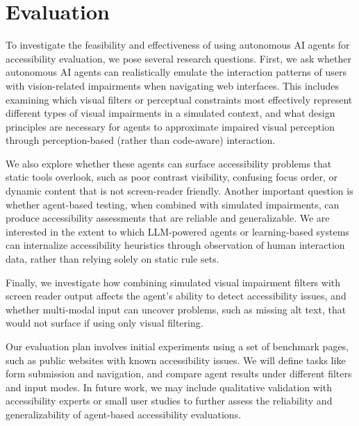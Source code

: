 

\section{Evaluation}

To investigate the feasibility and effectiveness of using autonomous AI agents for accessibility evaluation, we pose several research questions. First, we ask whether autonomous AI agents can realistically emulate the interaction patterns of users with vision-related impairments when navigating web interfaces. This includes examining which visual filters or perceptual constraints most effectively represent different types of visual impairments in a simulated context, and what design principles are necessary for agents to approximate impaired visual perception through perception-based (rather than code-aware) interaction.

We also explore whether these agents can surface accessibility problems that static tools overlook, such as poor contrast visibility, confusing focus order, or dynamic content that is not screen-reader friendly. Another important question is whether agent-based testing, when combined with simulated impairments, can produce accessibility assessments that are reliable and generalizable. We are interested in the extent to which LLM-powered agents or learning-based systems can internalize accessibility heuristics through observation of human interaction data, rather than relying solely on static rule sets.


Finally, we investigate how combining simulated visual impairment filters with screen reader output affects the agent's ability to detect accessibility issues, and whether multi-modal input can uncover problems, such as missing alt text, that would not surface if using only visual filtering.

Our evaluation plan involves initial experiments using a set of benchmark pages, such as public websites with known accessibility issues. We will define tasks like form submission and navigation, and compare agent results under different filters and input modes. In future work, we may include qualitative validation with accessibility experts or small user studies to further assess the reliability and generalizability of agent-based accessibility evaluations.
